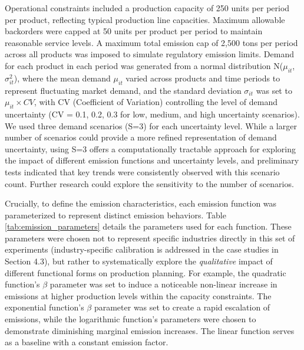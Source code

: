 Operational constraints included a production capacity of 250 units per period per product, reflecting typical production line capacities.  Maximum allowable backorders were capped at 50 units per product per period to maintain reasonable service levels. A maximum total emission cap of 2,500 tons per period across all products was imposed to simulate regulatory emission limits. Demand for each product in each period was generated from a normal distribution N($\mu_{it}$, $\sigma_{it}^2$), where the mean demand $\mu_{it}$ varied across products and time periods to represent fluctuating market demand, and the standard deviation $\sigma_{it}$ was set to $\mu_{it} \times CV$, with CV (Coefficient of Variation) controlling the level of demand uncertainty (CV = 0.1, 0.2, 0.3 for low, medium, and high uncertainty scenarios).  We used three demand scenarios (S=3) for each uncertainty level. While a larger number of scenarios could provide a more refined representation of demand uncertainty, using S=3 offers a computationally tractable approach for exploring the impact of different emission functions and uncertainty levels, and preliminary tests indicated that key trends were consistently observed with this scenario count.  Further research could explore the sensitivity to the number of scenarios.

Crucially, to define the emission characteristics, each emission function was parameterized to represent distinct emission behaviors.  Table \ref{tab:emission_parameters} details the parameters used for each function.  These parameters were chosen not to represent specific industries directly in this set of experiments (industry-specific calibration is addressed in the case studies in Section 4.3), but rather to systematically explore the \textit{qualitative} impact of different functional forms on production planning. For example, the quadratic function's $\beta$ parameter was set to induce a noticeable non-linear increase in emissions at higher production levels within the capacity constraints. The exponential function's $\beta$ parameter was set to create a rapid escalation of emissions, while the logarithmic function's parameters were chosen to demonstrate diminishing marginal emission increases.  The linear function serves as a baseline with a constant emission factor.

